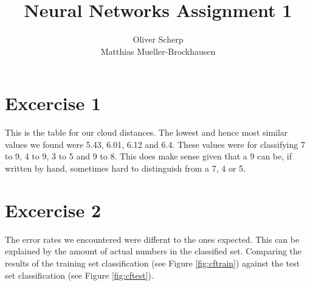 \documentclass{article}
\begin{document}
\title{Neural Networks Assignment 1}
\author{Oliver Scherp\\Matthias Mueller-Brockhausen}
\maketitle
\lstset{
  basicstyle=\ttfamily,
  keywordstyle=\bfseries,
  language=Java,
  frame=single,
  aboveskip=11pt,
  belowskip=11pt,
  breaklines=true,
  breakatwhitespace=false,
  showspaces=false,
  showstringspaces=false,
  numbers=left,
  stepnumber=1,    
  firstnumber=1,
  numberfirstline=true
}
\section{Excercise 1}
This is the table for our cloud distances.
The lowest and hence most similar values we found were 5.43, 6.01, 6.12 and 6.4.
These values were for classifying 7 to 9, 4 to 9, 3 to 5 and 9 to 8.
This does make sense given that a 9 can be, if written by hand, sometimes hard to distinguish from a 7, 4 or 5.


\section{Excercise 2}
The error rates we encountered were differnt to the ones expected. This can be explained by the amount of  actual numbers in the classified set.
Comparing the results of the training set classification (see Figure \ref{fig:cftrain}) against the test set classification (see Figure \ref{fig:cftest}).
\end{document}
